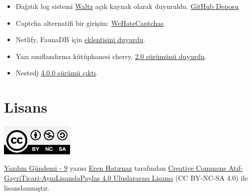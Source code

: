 \documentclass[11pt]{article}
\begin{document}
\begin{itemize}
{açtı}.
\item Dağıtık log sistemi \href{https://wecode.wepay.com/posts/waltz-a-distributed-write-ahead-log}{Waltz} açık kaynak olarak duyuruldu. \href{https://github.com/wepay/waltz}{GitHub Deposu}
\item Captcha alternatifi bir girişim: \href{https://wehatecaptchas.com/}{WeHateCaptchas}.
\item Netlify, FaunaDB için \href{https://www.netlify.com/blog/2019/09/10/announcing-the-faunadb-add-on-for-netlify/}{eklentisini duyurdu}.
\item Yazı sınıflandırma kütüphanesi cherry, \href{https://github.com/Windsooon/cherry/releases/tag/v2.0}{2.0 sürümünü duyurdu}.
\item Nestedj \href{https://github.com/eXsio/nestedj/releases/tag/4.0.0}{4.0.0 sürümü çıktı}.
\end{itemize}
\section{Lisans}
\label{sec:org0c39b92}
\begin{center}
\begin{center}
\includegraphics[height=1.5cm]{../../../img/CC_BY-NC-SA_4.0.png}
\end{center}

\href{yazilim-gundemi-09.pdf}{Yazılım Gündemi - 9} yazısı \href{https://erenhatirnaz.github.io}{Eren Hatırnaz} tarafından \href{http://creativecommons.org/licenses/by-nc-sa/4.0/}{Creative Commons
Atıf-GayriTicari-AynıLisanslaPaylaş 4.0 Uluslararası Lisansı} (CC BY-NC-SA 4.0)
ile lisanslanmıştır.
\end{center}
\end{document}
